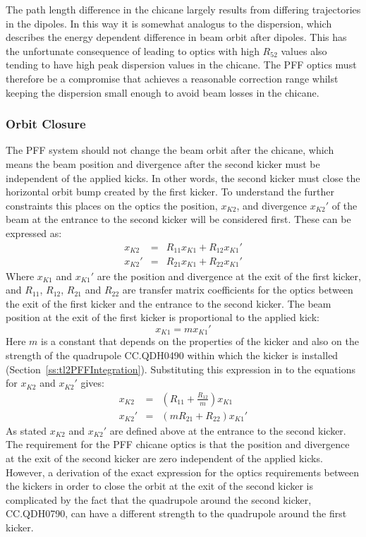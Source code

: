 The path length difference in the chicane largely results from differing trajectories in the dipoles. In this way it is somewhat analogus to the dispersion, which describes the energy dependent difference in beam orbit after dipoles. This has the unfortunate consequence of leading to optics with high \(R_{52}\) values also tending to have high peak dispersion values in the chicane. The PFF optics must therefore be a compromise that achieves a reasonable correction range whilst keeping the dispersion small enough to avoid beam losses in the chicane.

\subsubsection{Orbit Closure}

The PFF system should not change the beam orbit after the chicane, which means the beam position and divergence after the second kicker must be independent of the applied kicks. In other words, the second kicker must close the horizontal orbit bump created by the first kicker. To understand the further constraints this places on the optics the position, \(x_{K2}\), and divergence \(x_{K2}'\) of the beam at the entrance to the second kicker will be considered first. These can be expressed as:
\begin{eqnarray}
x_{K2} &=& R_{11}x_{K1} + R_{12}x_{K1}' \\
x_{K2}' &=& R_{21}x_{K1} + R_{22}x_{K1}'
\end{eqnarray}
Where \(x_{K1}\) and \(x_{K1}'\) are the position and divergence at the exit of the first kicker, and \(R_{11}\), \(R_{12}\), \(R_{21}\) and \(R_{22}\) are transfer matrix coefficients for the optics between the exit of the first kicker and the entrance to the second kicker. The beam position at the exit of the first kicker is proportional to the applied kick:
\begin{equation}
x_{K1} = m x_{K1}'
\end{equation}
Here \(m\) is a constant that depends on the properties of the kicker and also on the strength of the quadrupole CC.QDH0490 within which the kicker is installed (Section~\ref{ss:tl2PFFIntegration}). Substituting this expression in to the equations for \(x_{K2}\) and \(x_{K2}'\) gives:
\begin{eqnarray}
x_{K2} &=& \left(R_{11} + \frac{R_{12}}{m}\right)x_{K1} \\
x_{K2}' &=& (m R_{21} + R_{22})x_{K1}'
\end{eqnarray}
As stated \(x_{K2}\) and \(x_{K2}'\) are defined above at the entrance to the second kicker. The requirement for the PFF chicane optics is that the position and divergence at the exit of the second kicker are zero independent of the applied kicks. However, a derivation of the exact expression for the optics requirements between the kickers in order to close the orbit at the exit of the second kicker is complicated by the fact that the quadrupole around the second kicker, CC.QDH0790, can have a different strength to the quadrupole around the first kicker. 

